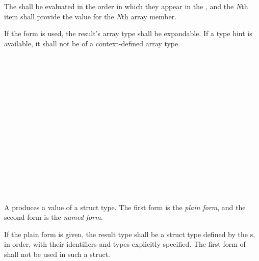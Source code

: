 \specsubsubitem
The  shall be evaluated in the order in which they
appear in the , and the \textit{N}th item shall
provide the value for the \textit{N}th array member.

\specsubsubitem
If the  form is used, the result's array type shall be expandable.
If a type hint is available, it shall not be of a context-defined array type.


\begin{grammar}
 \\
	 \terminal{\{}  \optional{\terminal{,}} \terminal{\}} \\
	 \terminal{\{}  \optional{\terminal{,}} \terminal{\}} \\

 \\
	 \\
	 \terminal{,}  \\
	 \\

 \\
	 \\
	 \terminal{,}  \\

 \\
	 \terminal{=}  \\
	 \terminal{:}  \terminal{=}  \\
	 \\
\end{grammar}

\specsubsubitem
A  produces a value of a struct type. The first
form is the \textit{plain form}, and the second form is the \textit{named form}.

\specsubsubitem
If the plain form is given, the result type shall be a struct type defined by
the s, in order, with their identifiers and types
explicitly specified. The first form of  shall not be
used in such a struct.

